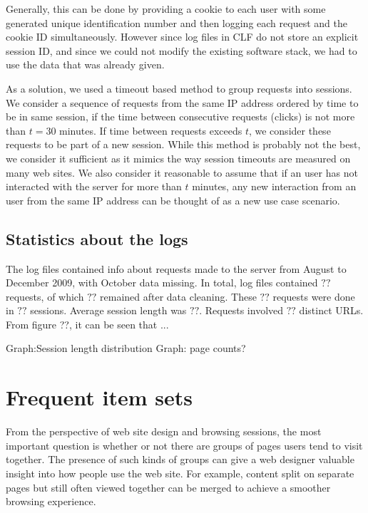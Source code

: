 \documentclass[english,a4paper]{article}
\begin{document}
Generally, this can be done by providing a cookie to each user with some generated unique identification number and then logging each request and the cookie ID simultaneously. However since log files in CLF do not store an explicit session ID, and since we could not modify the existing software stack, we had to use the data that was already given.  

As a solution, we used a timeout based method to group requests into sessions. We consider a sequence of requests from the same IP address ordered by time to be in
same session, if the time between consecutive requests (clicks) is not more
than $t = 30$ minutes. If time between requests exceeds $t$, we
consider these requests to be part of a new session. While this method is
probably not the best, we consider it sufficient as it mimics the way session
timeouts are measured on many web sites. We also consider it reasonable to
assume that if an user has not interacted with the server for more than $t$
minutes, any new interaction from an user from the same IP address can be
thought of as a new use case scenario.










\subsection{Statistics about the logs} 
The log files contained info about requests made to the server from August to December 2009, with October data missing. In total, log files contained 
$??$ requests, of which $??$ remained after data cleaning. These $??$ requests were done in $??$ sessions. Average session length was $??$. Requests involved $??$ distinct URLs. From figure ??, it can be seen that ...

Graph:Session length distribution
Graph: page counts?
















\section{Frequent item sets} 
From the perspective of web site design and browsing sessions, the most important question is whether or not there are groups of pages users tend to visit together. The presence of such kinds of groups can give a web designer valuable insight into how people use the web site. For example, content split on separate pages but still often viewed together can be merged to achieve a smoother browsing experience.
\end{document}

